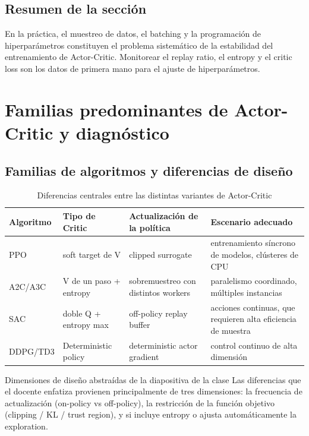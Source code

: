 \documentclass[a4paper]{article}
\begin{document}
\subsection{Resumen de la sección}

En la práctica, el muestreo de datos, el batching y la programación de hiperparámetros constituyen el problema sistemático de la estabilidad del entrenamiento de Actor-Critic. Monitorear el replay ratio, el entropy y el critic loss son los datos de primera mano para el ajuste de hiperparámetros.
\section{Familias predominantes de Actor-Critic y diagnóstico}

\subsection{Familias de algoritmos y diferencias de diseño}

\begin{table}[H]
\centering
\begin{tabular}{p{}p{}p{}p{}}
\toprule
Algoritmo & Tipo de Critic & Actualización de la política & Escenario adecuado \\
\midrule
PPO & soft target de V & clipped surrogate & entrenamiento síncrono de modelos, clústeres de CPU \\
A2C/A3C & V de un paso + entropy & sobremuestreo con distintos workers & paralelismo coordinado, múltiples instancias \\
SAC & doble Q + entropy max & off-policy replay buffer & acciones continuas, que requieren alta eficiencia de muestra \\
DDPG/TD3 & Deterministic policy & deterministic actor gradient & control continuo de alta dimensión \\
\bottomrule
\end{tabular}
\caption{Diferencias centrales entre las distintas variantes de Actor-Critic}
\end{table}

\begin{knowledgebox}{Dimensiones de diseño abstraídas de la diapositiva de la clase}
Las diferencias que el docente enfatiza provienen principalmente de tres dimensiones: la frecuencia de actualización (on-policy vs off-policy), la restricción de la función objetivo (clipping / KL / trust region), y si incluye entropy o ajusta automáticamente la exploration.
\end{knowledgebox}
\end{document}
